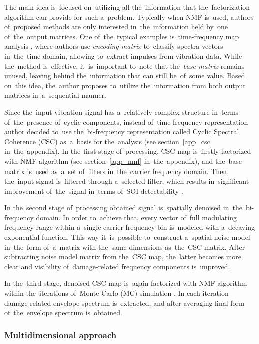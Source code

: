 The main idea is~focused on~utilizing all the~information that the~factorization algorithm can provide for such a~problem. Typically when NMF is~used, authors of~proposed methods are only interested in~the~information held by~one of~the~output matrices. One of~the~typical examples is~time-frequency map analysis \cite{wodecki2017local}, where authors use \emph{encoding matrix} to~classify spectra vectors in~the~time domain, allowing to~extract impulses from vibration data. While the~method is~effective, it~is~important to~note that the~\emph{base matrix} remains unused, leaving behind the~information that can still be~of~some value. Based on~this idea, the~author proposes to~utilize the~information from both output matrices in~a~sequential manner. 

Since the~input vibration signal has a~relatively complex structure in~terms of~the~presence of~cyclic components, instead of~time-frequency representation author decided to~use the~bi-frequency representation called Cyclic Spectral Coherence (CSC) as~a~basis for the~analysis (see section~\ref{app_csc} in~the~appendix). In the~first stage of~processing, CSC map is~firstly factorized with NMF algorithm (see section~\ref{app_nmf} in~the~appendix), and the~base matrix is~used as~a~set of~filters in~the~carrier frequency domain. Then, the~input signal is~filtered through a~selected filter, which results in~significant improvement of~the~signal in~terms of~SOI detectability \cite{wodecki2017novel}. 

In the~second stage of~processing obtained signal is~spatially denoised in~the~bi-frequency domain. In order to~achieve that, every vector of~full modulating frequency range within a~single carrier frequency bin is~modeled with a~decaying exponential function. This way it~is~possible to~construct a~spatial noise model in~the~form of~a~matrix with the~same dimensions as~the~CSC matrix. After subtracting noise model matrix from the~CSC map, the~latter becomes more clear and visibility of~damage-related frequency components is~improved.

In the~third stage, denoised CSC map is~again factorized with NMF algorithm within the~iterations of~Monte Carlo (MC) simulation \cite{metropolis1987beginning}. In each iteration damage-related envelope spectrum is~extracted, and after averaging final form of~the~envelope spectrum is~obtained.

\subsubsection{Multidimensional approach}

